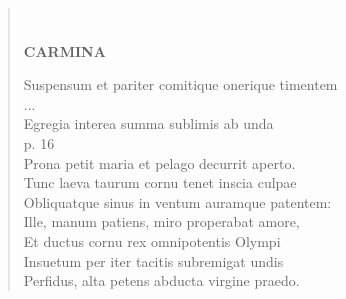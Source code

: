 \documentclass[11pt, a4paper]{report}
\begin{document}
\begin{verse}
        ﻿\pagebreak 
     \marginpar{[50]} \begin{center} \textbf{CARMINA} \end{center}Suspensum et pariter comitique onerique timentem \\ 
                     \lbrack ... \rbrack 
                 \\ Egregia interea summa sublimis ab unda \\ p. 16 \\ Prona petit maria et pelago decurrit aperto. \\ Tunc laeva taurum cornu tenet inscia culpae \\ Obliquatque sinus in ventum auramque patentem: \\ Ille, manum patiens, miro properabat amore, \\ Et ductus cornu rex omnipotentis Olympi \\ Insuetum per iter tacitis subremigat undis \\ Perfidus, alta petens abducta virgine praedo. \\ 
      \end{verse}
  
\end{document}
